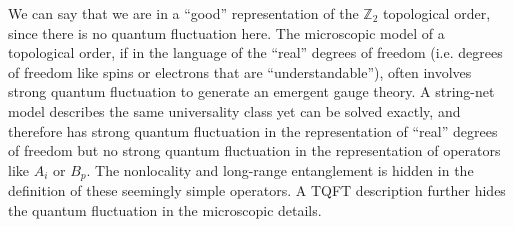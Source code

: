 \documentclass[hyperref, a4paper]{article}
\begin{document}

We can say that we are in a ``good'' representation of the $\mathbb{Z}_2$ topological order, since there is no 
quantum fluctuation here. The microscopic model of a topological order, if in the language of the ``real'' 
degrees of freedom (i.e. degrees of freedom like spins or electrons that are ``understandable''), often involves strong quantum fluctuation to generate an emergent gauge theory.
A string-net model describes the same universality class yet can be solved exactly, and therefore has 
strong quantum fluctuation in the representation of ``real'' degrees of freedom but no strong quantum 
fluctuation in the representation of operators like $A_i$ or $B_p$. The nonlocality and long-range entanglement 
is hidden in the definition of these seemingly simple operators. A TQFT description further hides the 
quantum fluctuation in the microscopic details.


 
\end{document}
